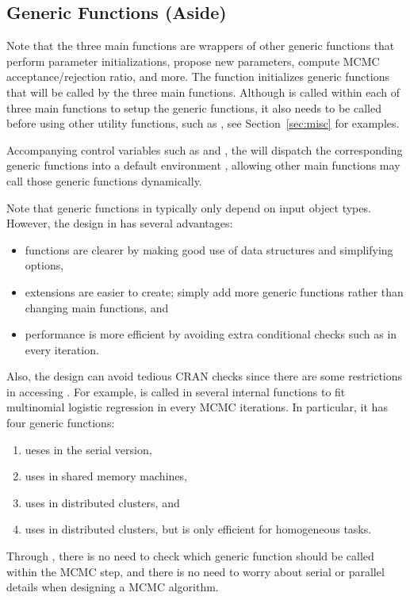 \subsection[Generic Functions (Aside)]{Generic Functions (Aside)}
\label{sec:generic_functions}

Note that the three main functions are wrappers of other generic functions that
perform parameter initializations, propose new parameters, compute
MCMC acceptance/rejection ratio, and more.
The function  initializes generic functions that
will be called by the three main functions.
Although  is called within each of three main
functions to setup the generic functions, it also needs to be called before
using other utility functions, such as , see
Section~\ref{sec:misc} for examples.

Accompanying control variables such as  and ,
the  will dispatch the
corresponding generic functions into a default environment ,
allowing other main functions may call those generic functions dynamically.

Note that generic functions in  typically only depend on
input object types.  However, the design in  has 
several advantages:
\begin{itemize}
\item functions are clearer by making good use of data structures and
      simplifying options,
\item extensions are easier to create; simply add more generic functions 
      rather than changing main functions, and
\item performance is more efficient by avoiding extra
      conditional checks such as 
      in every iteration.
\end{itemize}
Also, the design can avoid tedious CRAN checks since there are some restrictions
in accessing . For example, 
 is called in several
internal functions to fit multinomial logistic regression in every MCMC
iterations. In particular, it has four generic functions:
\begin{enumerate}
\item {} ueses  in the serial version,
\item {} uses 
      in shared memory machines,
\item {} uses 
      in distributed clusters, and
\item {} uses 
      in distributed clusters, but is only efficient for homogeneous tasks.
\end{enumerate}
Through , there is no need to check which generic
function should be called within the MCMC step, and there is no need to worry
about serial or parallel details when designing a MCMC algorithm.

